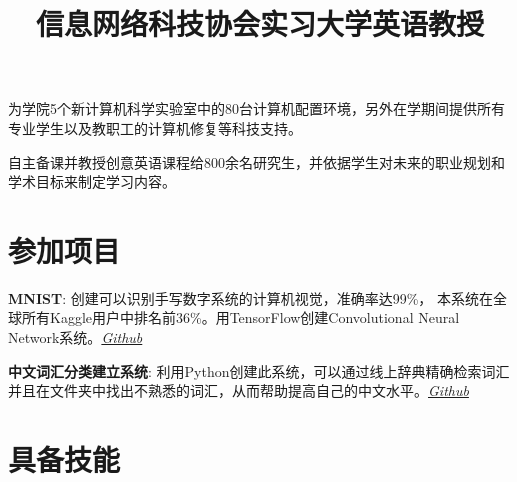 \documentclass[margin]{res}
\begin{document}
\begin{resume}
\title{\textbf{信息网络科技协会实习}}
\begin{position}
为学院5个新计算机科学实验室中的80台计算机配置环境，另外在学期间提供所有专业学生以及教职工的计算机修复等科技支持。
\end{position}

\title{\textbf{大学英语教授}}
\begin{position}
自主备课并教授创意英语课程给800余名研究生，并依据学生对未来的职业规划和学术目标来制定学习内容。
\end{position}

\section{参加项目}
\par
\textbf{MNIST}:
创建可以识别手写数字系统的计算机视觉，准确率达99\%， 本系统在全球所有Kaggle用户中排名前36\%。用TensorFlow创建Convolutional Neural Network系统。\textit{\href{https://github.com/lucaskjaero/MNIST}{Github}}


\par
\textbf{中文词汇分类建立系统}:
利用Python创建此系统，可以通过线上辞典精确检索词汇并且在文件夹中找出不熟悉的词汇，从而帮助提高自己的中文水平。\textit{\href{https://github.com/lucaskjaero/Chinese-Vocabulary-Finder}{Github}}


\section{具备技能}


\end{resume}
\end{document}
